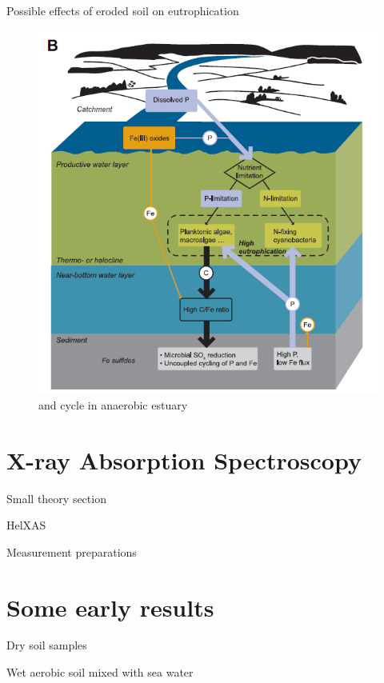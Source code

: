 \documentclass{beamer}
\begin{document}
  \begin{frame}{Possible effects of eroded soil on eutrophication}
    \begin{figure}
      \centering
      \caption{\footnotesize{ and  cycle in anaerobic estuary}}
      \includegraphics[scale=0.31]{../Kuvat/eutrophication_B.png}     
    \end{figure}
  \end{frame}
  
  \section{X-ray Absorption Spectroscopy}
  \begin{frame}{Small theory section}
  
  \end{frame}
  \begin{frame}{HelXAS}
  
  \end{frame}
  \begin{frame}{Measurement preparations}
  
  \end{frame}
  \section{Some early results}
  \begin{frame}{Dry soil samples}
  
  \end{frame}
  \begin{frame}{Wet aerobic soil mixed with sea water}
  
  \end{frame}
\end{document}
